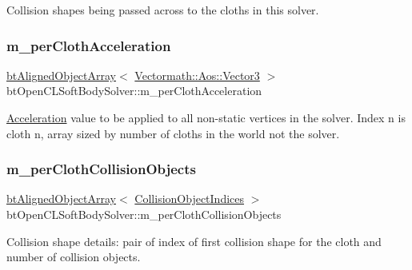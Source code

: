 Collision shapes being passed across to the cloths in this solver. \mbox{\label{classbtOpenCLSoftBodySolver_ac958100c16c9c92b08cf2f6066697990}} 
\subsubsection{\texorpdfstring{m\+\_\+per\+Cloth\+Acceleration}{m\_perClothAcceleration}}
{\footnotesize\ttfamily \hyperlink{classbtAlignedObjectArray}{bt\+Aligned\+Object\+Array}$<$ \hyperlink{classVectormath_1_1Aos_1_1Vector3}{Vectormath\+::\+Aos\+::\+Vector3} $>$ bt\+Open\+C\+L\+Soft\+Body\+Solver\+::m\+\_\+per\+Cloth\+Acceleration\hspace{0.3cm}{\ttfamily [protected]}}

\hyperlink{classAcceleration}{Acceleration} value to be applied to all non-\/static vertices in the solver. Index n is cloth n, array sized by number of cloths in the world not the solver. \mbox{\label{classbtOpenCLSoftBodySolver_a01356688ec3d99fe305ee2e70cf884d1}} 
\subsubsection{\texorpdfstring{m\+\_\+per\+Cloth\+Collision\+Objects}{m\_perClothCollisionObjects}}
{\footnotesize\ttfamily \hyperlink{classbtAlignedObjectArray}{bt\+Aligned\+Object\+Array}$<$ \hyperlink{structbtOpenCLSoftBodySolver_1_1CollisionObjectIndices}{Collision\+Object\+Indices} $>$ bt\+Open\+C\+L\+Soft\+Body\+Solver\+::m\+\_\+per\+Cloth\+Collision\+Objects\hspace{0.3cm}{\ttfamily [protected]}}

Collision shape details\+: pair of index of first collision shape for the cloth and number of collision objects. \mbox{\label{classbtOpenCLSoftBodySolver_aadcf2cae029a38caf6251ef3546eaae9}} 

